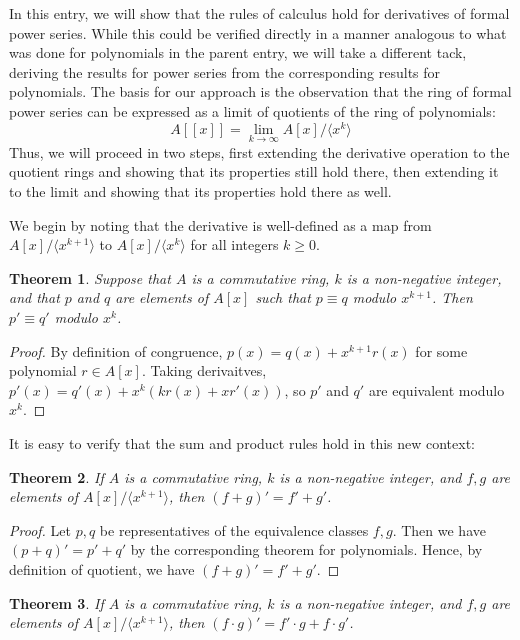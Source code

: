 \documentclass[12pt]{article}
\newtheorem{thm}{Theorem}
\begin{document}
In this entry, we will show that the rules of calculus
hold for derivatives of formal power series.  While
this could be verified directly in a manner analogous 
to what was done for polynomials in the parent entry,
we will take a different tack, deriving the results
for power series from the corresponding results for
polynomials.  The basis for our approach is the 
observation that the ring of formal power series can
be expressed as a limit of quotients of the ring of
polynomials:
\[
 A[[x]]  = \lim_{k \to \infty} A[x] / \langle x^k \rangle
\]
Thus, we will proceed in two steps, first extending the 
derivative operation to the quotient rings and showing that 
its properties still hold there, then extending it to the 
limit and showing that its properties hold there as well.

We begin by noting that the derivative is well-defined 
as a map from $A[x] / \langle x^{k+1} \rangle$ to 
$A[x] / \langle x^k \rangle$ for all integers $k \ge 0$.  

\begin{thm}
Suppose that $A$ is a commutative ring, $k$ is a non-negative
integer, and that $p$ and $q$ are elements of $A[x]$ such
that $p \equiv q$ modulo $x^{k+1}$.  Then $p' \equiv q'$
modulo $x^k$.
\end{thm}

\begin{proof}
By definition of congruence, $p(x) = q(x) + x^{k+1} r(x)$ for 
some polynomial $r \in A[x]$.  Taking derivaitves, $p'(x) = 
q'(x) + x^k (k r(x) + x r'(x))$, so $p'$ and $q'$ are 
equivalent modulo $x^k$.
\end{proof}

It is easy to verify that the sum and product rules hold
in this new context:

\begin{thm}
If $A$ is a commutative ring, $k$ is a non-negative integer,
and $f,g$ are elements of $A[x] / \langle x^{k+1} \rangle$,
then $(f+g)' = f' + g'$.
\end{thm}

\begin{proof}
Let $p,q$ be representatives of the equivalence classes
$f,g$.  Then we have $(p+q)' = p' + q'$ by the corresponding
theorem for polynomials.  Hence, by definition of quotient,
we have $(f + g)' = f' + g'$.
\end{proof}

\begin{thm}
If $A$ is a commutative ring, $k$ is a non-negative integer,
and $f,g$ are elements of $A[x] / \langle x^{k+1} \rangle$,
then $(f \cdot g)' = f' \cdot g + f \cdot g'$.
\end{thm}
\end{document}
